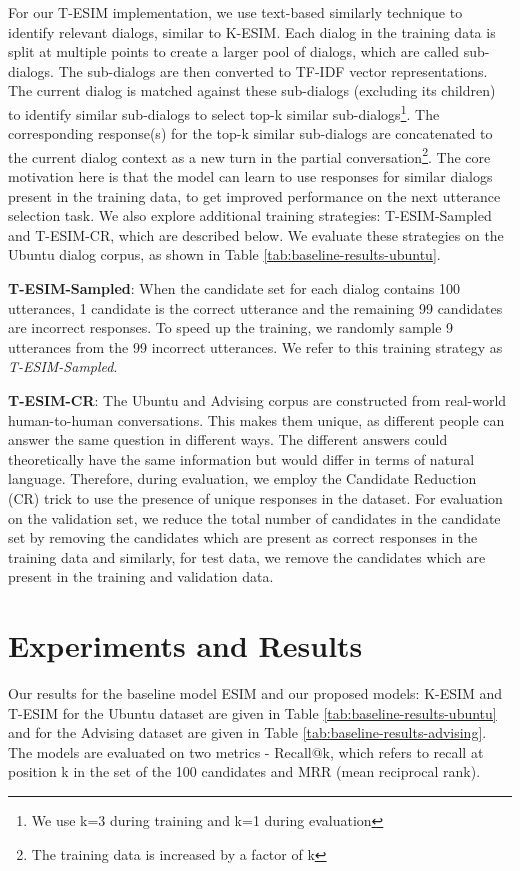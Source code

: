 \documentclass[letterpaper]{article} %
\begin{document}
For our T-ESIM implementation, we use text-based similarly technique to identify relevant dialogs, similar to K-ESIM. Each dialog in the training data is split at multiple points to create a larger pool of dialogs, which are called sub-dialogs. The sub-dialogs are then converted to TF-IDF vector representations. The current dialog is matched against these sub-dialogs (excluding its children) to identify similar sub-dialogs to select top-k similar sub-dialogs\footnote{We use k=3 during training and k=1 during evaluation}. The corresponding response(s) for the top-k similar sub-dialogs are concatenated to the current dialog context as a new turn in the partial conversation\footnote{The training data is increased by a factor of k}. The core motivation here is that the model can learn to use responses for similar dialogs present in the training data, to get improved performance on the next utterance selection task. We also explore additional training strategies: T-ESIM-Sampled and T-ESIM-CR, which are described below. We evaluate these strategies on the Ubuntu dialog corpus, as shown in Table \ref{tab:baseline-results-ubuntu}.

\textbf{T-ESIM-Sampled}: When the candidate set for each dialog contains 100 utterances, 1 candidate is the correct utterance and the remaining 99 candidates are incorrect responses. To speed up the training, we randomly sample 9 utterances from the 99 incorrect utterances. We refer to this training strategy as \textit{T-ESIM-Sampled}.

\textbf{T-ESIM-CR}: The Ubuntu and Advising corpus are constructed from real-world human-to-human conversations. This makes them unique, as different people can answer the same question in different ways. The different answers could theoretically have the same information but would differ in terms of natural language. Therefore, during evaluation, we employ the Candidate Reduction (CR) trick to use the presence of unique responses in the dataset. For evaluation on the validation set, we reduce the total number of candidates in the candidate set by removing the candidates which are present as correct responses in the training data and similarly, for test data, we remove the candidates which are present in the training and validation data.




\vspace{-3.58mm}
\section{Experiments and Results}
\label{Experiments and Results}
Our results for the baseline model ESIM and our proposed models: K-ESIM and T-ESIM for the Ubuntu dataset are given in Table \ref{tab:baseline-results-ubuntu} and for the Advising dataset are given in Table \ref{tab:baseline-results-advising}. The models are evaluated on two metrics - Recall@k, which refers to recall at position k in the set of the 100 candidates and MRR (mean reciprocal rank).
\end{document}
